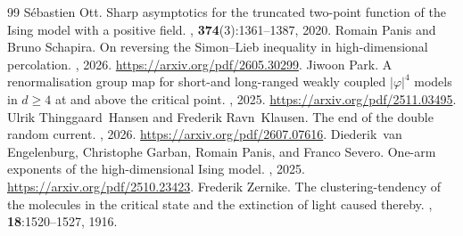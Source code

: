 \documentclass[10pt,a4paper]{amsart}
\numberwithin{equation}{section}
\begin{document}
\begin{thebibliography}{99}
 S{\'e}bastien Ott. \newblock Sharp asymptotics for the truncated two-point function of the {I}sing model with a positive field. , \textbf{374}(3):1361--1387, 2020.
 Romain Panis and Bruno Schapira. \newblock On reversing the {S}imon--{L}ieb inequality in high-dimensional percolation. , 2026. \newblock \url{https://arxiv.org/pdf/2605.30299}.
 Jiwoon Park. \newblock A renormalisation group map for short-and long-ranged weakly coupled $|\varphi|^4$ models in $d\geq 4$ at and above the critical point. , 2025. \newblock \url{https://arxiv.org/pdf/2511.03495}.
 Ulrik Thinggaard~Hansen and Frederik Ravn~Klausen. \newblock The end of the double random current. , 2026. \newblock \url{https://arxiv.org/pdf/2607.07616}.
 Diederik~van Engelenburg, Christophe Garban, Romain Panis, and Franco Severo. \newblock One-arm exponents of the high-dimensional {I}sing model. , 2025. \newblock \url{https://arxiv.org/pdf/2510.23423}.
 Frederik Zernike. \newblock The clustering-tendency of the molecules in the critical state and the extinction of light caused thereby. , \textbf{18}:1520--1527, 1916.
\end{thebibliography}
\end{document}
